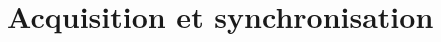 \documentclass[resume]{subfiles}
\begin{document}
\section{Acquisition et synchronisation}
\end{document}
